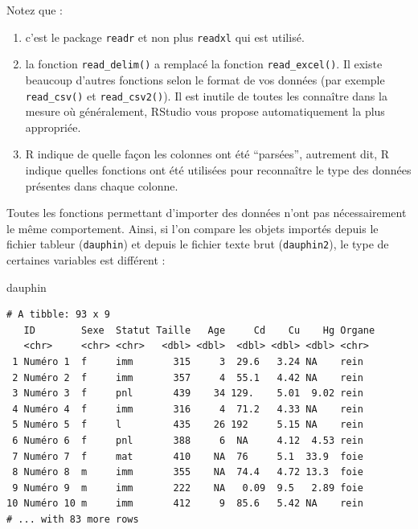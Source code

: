 \documentclass[a4paperpaper,]{article}
\newenvironment{Shaded}{\begin{snugshade}}{\end{snugshade}}
\newcommand{\NormalTok}[1]{\textcolor[rgb]{0.12,0.11,0.11}{#1}}
\providecommand{\tightlist}{%
  \setlength{\itemsep}{0pt}\setlength{\parskip}{0pt}}
\theoremstyle{definition}
\theoremstyle{definition}
\theoremstyle{definition}
\theoremstyle{remark}
\begin{document}
Notez que :

\begin{enumerate}
\def\labelenumi{\arabic{enumi}.}
\tightlist
\item
  c'est le package \texttt{readr} et non plus \texttt{readxl} qui est
  utilisé.
\item
  la fonction \texttt{read\_delim()} a remplacé la fonction
  \texttt{read\_excel()}. Il existe beaucoup d'autres fonctions selon le
  format de vos données (par exemple \texttt{read\_csv()} et
  \texttt{read\_csv2()}). Il est inutile de toutes les connaître dans la
  mesure où généralement, RStudio vous propose automatiquement la plus
  appropriée.
\item
  R indique de quelle façon les colonnes ont été ``parsées'', autrement
  dit, R indique quelles fonctions ont été utilisées pour reconnaître le
  type des données présentes dans chaque colonne.
\end{enumerate}

Toutes les fonctions permettant d'importer des données n'ont pas
nécessairement le même comportement. Ainsi, si l'on compare les objets
importés depuis le fichier tableur (\texttt{dauphin}) et depuis le
fichier texte brut (\texttt{dauphin2}), le type de certaines variables
est différent :

\begin{Shaded}
\begin{Highlighting}[]
\NormalTok{dauphin}
\end{Highlighting}
\end{Shaded}

\begin{verbatim}
# A tibble: 93 x 9
   ID        Sexe  Statut Taille   Age     Cd    Cu    Hg Organe
   <chr>     <chr> <chr>   <dbl> <dbl>  <dbl> <dbl> <dbl> <chr> 
 1 Numéro 1  f     imm       315     3  29.6   3.24 NA    rein  
 2 Numéro 2  f     imm       357     4  55.1   4.42 NA    rein  
 3 Numéro 3  f     pnl       439    34 129.    5.01  9.02 rein  
 4 Numéro 4  f     imm       316     4  71.2   4.33 NA    rein  
 5 Numéro 5  f     l         435    26 192     5.15 NA    rein  
 6 Numéro 6  f     pnl       388     6  NA     4.12  4.53 rein  
 7 Numéro 7  f     mat       410    NA  76     5.1  33.9  foie  
 8 Numéro 8  m     imm       355    NA  74.4   4.72 13.3  foie  
 9 Numéro 9  m     imm       222    NA   0.09  9.5   2.89 foie  
10 Numéro 10 m     imm       412     9  85.6   5.42 NA    rein  
# ... with 83 more rows
\end{verbatim}
\end{document}
